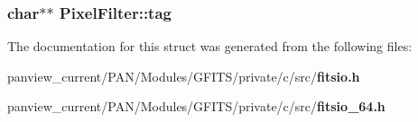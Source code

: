 \subsubsection{\setlength{\rightskip}{0pt plus 5cm}char$\ast$$\ast$ \bf{Pixel\-Filter::tag}}\label{structPixelFilter_71b96f3e8b70a5fefeca1fa33a2bf716}




The documentation for this struct was generated from the following files:\begin{CompactItemize}
\item 
panview\_\-current/PAN/Modules/GFITS/private/c/src/\bf{fitsio.h}\item 
panview\_\-current/PAN/Modules/GFITS/private/c/src/\bf{fitsio\_\-64.h}\end{CompactItemize}
